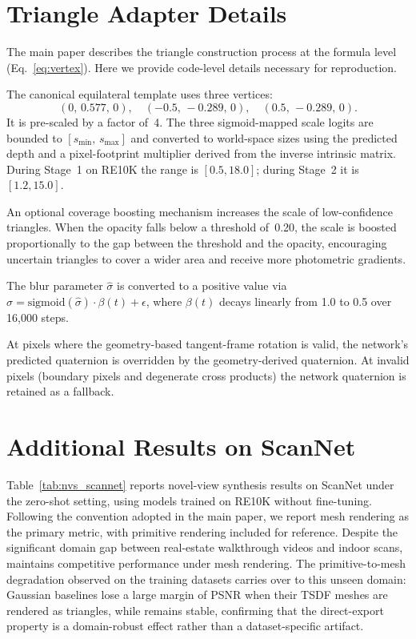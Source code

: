 \section{Triangle Adapter Details}
\label{sec:app_triangle_adapter}

The main paper describes the triangle construction process at the formula level (Eq.~\eqref{eq:vertex}). Here we provide code-level details necessary for reproduction.

The canonical equilateral template uses three vertices:
\[
(0,\, 0.577,\, 0),\quad
(-0.5,\, -0.289,\, 0),\quad
(0.5,\, -0.289,\, 0).
\]
It is pre-scaled by a factor of~4. The three sigmoid-mapped scale logits are bounded to $[s_{\min},\, s_{\max}]$ and converted to world-space sizes using the predicted depth and a pixel-footprint multiplier derived from the inverse intrinsic matrix. During Stage~1 on RE10K the range is $[0.5, 18.0]$; during Stage~2 it is $[1.2, 15.0]$.

An optional coverage boosting mechanism increases the scale of low-confidence triangles. When the opacity falls below a threshold of~0.20, the scale is boosted proportionally to the gap between the threshold and the opacity, encouraging uncertain triangles to cover a wider area and receive more photometric gradients.

The blur parameter $\hat{\sigma}$ is converted to a positive value via $\sigma = \mathrm{sigmoid}(\hat{\sigma}) \cdot \beta(t) + \epsilon$, where $\beta(t)$ decays linearly from 1.0 to 0.5 over 16{,}000 steps.

At pixels where the geometry-based tangent-frame rotation is valid, the network's predicted quaternion is overridden by the geometry-derived quaternion. At invalid pixels (boundary pixels and degenerate cross products) the network quaternion is retained as a fallback.

\section{Additional Results on ScanNet}
\label{sec:supp_scannet_nvs}

Table~\ref{tab:nvs_scannet} reports novel-view synthesis results on ScanNet under the zero-shot setting, using models trained on RE10K without fine-tuning. Following the convention adopted in the main paper, we report mesh rendering as the primary metric, with primitive rendering included for reference. Despite the significant domain gap between real-estate walkthrough videos and indoor scans, \method maintains competitive performance under mesh rendering. The primitive-to-mesh degradation observed on the training datasets carries over to this unseen domain: Gaussian baselines lose a large margin of PSNR when their TSDF meshes are rendered as triangles, while \method remains stable, confirming that the direct-export property is a domain-robust effect rather than a dataset-specific artifact.

